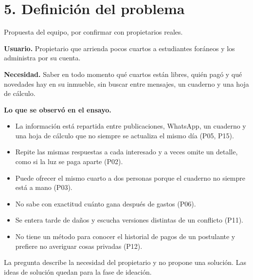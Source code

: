 \documentclass[11pt,a4paper]{article}
\begin{document}

\section*{5. Definición del problema}

Propuesta del equipo, por confirmar con propietarios reales.

\textbf{Usuario.} Propietario que arrienda pocos cuartos a estudiantes foráneos y los administra por su cuenta.

\textbf{Necesidad.} Saber en todo momento qué cuartos están libres, quién pagó y qué novedades hay en su inmueble, sin buscar entre mensajes, un cuaderno y una hoja de cálculo.

\textbf{Lo que se observó en el ensayo.}
\begin{itemize}
\item La información está repartida entre publicaciones, WhatsApp, un cuaderno y una hoja de cálculo que no siempre se actualiza el mismo día (P05, P15).
\item Repite las mismas respuestas a cada interesado y a veces omite un detalle, como si la luz se paga aparte (P02).
\item Puede ofrecer el mismo cuarto a dos personas porque el cuaderno no siempre está a mano (P03).
\item No sabe con exactitud cuánto gana después de gastos (P06).
\item Se entera tarde de daños y escucha versiones distintas de un conflicto (P11).
\item No tiene un método para conocer el historial de pagos de un postulante y prefiere no averiguar cosas privadas (P12).
\end{itemize}

\begin{center}
\end{center}

La pregunta describe la necesidad del propietario y no propone una solución. Las ideas de solución quedan para la fase de ideación.

\end{document}
